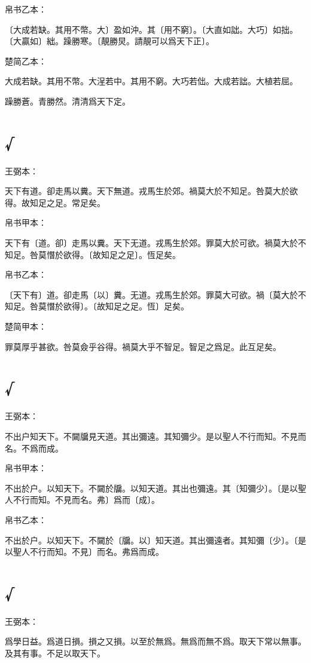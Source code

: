 \documentclass[a5paper]{ctexbook}
\begin{document}
    帛书乙本：

    〔大成若缺。其用不幣。大〕盈如沖。其〔用不窮〕。〔大直如詘。大巧〕如拙。〔大贏如〕絀。躁勝寒。〔靚勝炅。請靚可以爲天下正〕。

    楚简乙本：

    大成若缺。其用不幣。大浧若中。其用不窮。大巧若㑁。大成若詘。大植若屈。

    躁勝蒼。青勝然。清清爲天下定。

    \chapter{√}
    王弼本：

    天下有道。卻走馬以糞。天下無道。戎馬生於郊。禍莫大於不知足。咎莫大於欲得。故知足之足。常足矣。

    
    帛书甲本：

    天下有〔道。卻〕走馬以糞。天下无道。戎馬生於郊。罪莫大於可欲。禍莫大於不知足。咎莫憯於欲得。〔故知足之足〕。恆足矣。

    帛书乙本：

    〔天下有〕道。卻走馬〔以〕糞。无道。戎馬生於郊。罪莫大可欲。禍〔莫大於不知足。咎莫憯於欲得〕。〔故知足之足。恆〕足矣。

    楚简甲本：

    罪莫厚乎甚欲。咎莫僉乎谷得。禍莫大乎不智足。智足之爲足。此互足矣。

    \chapter{√}
    王弼本：

    不出户知天下。不闚牖見天道。其出彌遠。其知彌少。是以聖人不行而知。不見而名。不爲而成。

    
    帛书甲本：

    不出於户。以知天下。不闚於牖。以知天道。其出也彌遠。其〔知彌少〕。〔是以聖人不行而知。不見而名。弗〕爲而〔成〕。

    帛书乙本：

    不出於户。以知天下。不闚於〔牖。以〕知天道。其出彌遠者。其知彌〔少〕。〔是以聖人不行而知。不見〕而名。弗爲而成。

    \chapter{√}
    王弼本：

    爲學日益。爲道日損。損之又損。以至於無爲。無爲而無不爲。取天下常以無事。及其有事。不足以取天下。
\end{document}
